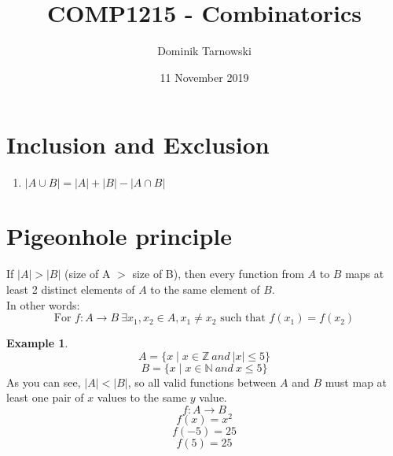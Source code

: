 \documentclass{article}
\theoremstyle{definition}
\newtheorem{ex}{Example}[section]
\begin{document}
  \title{COMP1215 - Combinatorics}
  \author{Dominik Tarnowski}
  \date{11 November 2019}
  \maketitle

  \tableofcontents


  \section{Inclusion and Exclusion}
  \begin{enumerate}
    \item $|A \cup B| = |A| + |B| - |A \cap B|$
  \end{enumerate}

  \section{Pigeonhole principle}
  If $|A| > |B|$ (size of A $>$ size of B), then every function from $A$ to $B$ maps at least 2 distinct elements of $A$ to the same element of $B$. \\
  In other words:
  \[\text{For } f:A \to B\ \exists x_1,x_2 \in A, x_1 \neq x_2 \text{ such that } f(x_1) = f(x_2) \]
  
  \begin{ex}
    \[A = \{x \mid x \in \mathbb{Z}\ and\ |x| \leq 5\}\]
    \[B = \{x \mid x \in \mathbb{N}\ and\ x \leq 5\}\]
    As you can see, $|A|<|B|$, so all valid functions between $A$ and $B$ must map at least one pair of $x$ values to the same $y$ value.
    \[f: A \to B\]
    \[f(x) = x^2\]
    \[f(-5) = 25\]
    \[f(5) = 25\]
  \end{ex}
\end{document}
